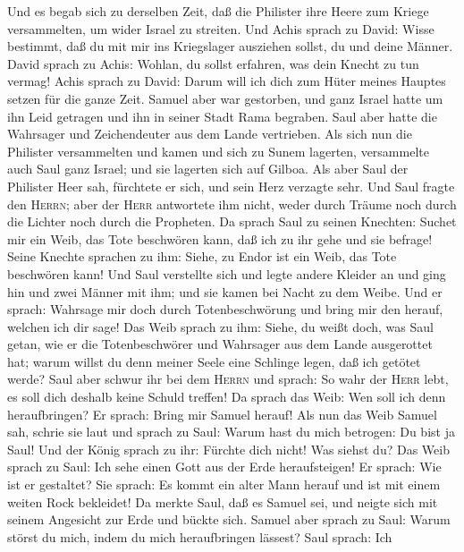  Und es begab sich zu derselben Zeit, daß die Philister
ihre Heere zum Kriege versammelten, um wider Israel zu streiten. Und
Achis sprach zu David: Wisse bestimmt, daß du mit mir ins Kriegslager
ausziehen sollst, du und deine Männer.  David sprach zu
Achis: Wohlan, du sollst erfahren, was dein Knecht zu tun vermag! Achis
sprach zu David: Darum will ich dich zum Hüter meines Hauptes setzen für
die ganze Zeit.  Samuel aber war gestorben, und ganz
Israel hatte um ihn Leid getragen und ihn in seiner Stadt Rama begraben.
Saul aber hatte die Wahrsager und Zeichendeuter aus dem Lande
vertrieben.  Als sich nun die Philister versammelten und
kamen und sich zu Sunem lagerten, versammelte auch Saul ganz Israel; und
sie lagerten sich auf Gilboa.  Als aber Saul der Philister
Heer sah, fürchtete er sich, und sein Herz verzagte sehr. 
Und Saul fragte den \textsc{Herrn}; aber der \textsc{Herr} antwortete
ihm nicht, weder durch Träume noch durch die Lichter noch durch die
Propheten.  Da sprach Saul zu seinen Knechten: Suchet mir
ein Weib, das Tote beschwören kann, daß ich zu ihr gehe und sie befrage!
Seine Knechte sprachen zu ihm: Siehe, zu Endor ist ein Weib, das Tote
beschwören kann!  Und Saul verstellte sich und legte
andere Kleider an und ging hin und zwei Männer mit ihm; und sie kamen
bei Nacht zu dem Weibe. Und er sprach: Wahrsage mir doch durch
Totenbeschwörung und bring mir den herauf, welchen ich dir sage!
 Das Weib sprach zu ihm: Siehe, du weißt doch, was Saul
getan, wie er die Totenbeschwörer und Wahrsager aus dem Lande
ausgerottet hat; warum willst du denn meiner Seele eine Schlinge legen,
daß ich getötet werde?  Saul aber schwur ihr bei dem
\textsc{Herrn} und sprach: So wahr der \textsc{Herr} lebt, es soll dich
deshalb keine Schuld treffen!  Da sprach das Weib: Wen
soll ich denn heraufbringen? Er sprach: Bring mir Samuel herauf!
 Als nun das Weib Samuel sah, schrie sie laut und sprach
zu Saul: Warum hast du mich betrogen: Du bist ja Saul! 
Und der König sprach zu ihr: Fürchte dich nicht! Was siehst du? Das Weib
sprach zu Saul: Ich sehe einen Gott aus der Erde heraufsteigen!
 Er sprach: Wie ist er gestaltet? Sie sprach: Es kommt
ein alter Mann herauf und ist mit einem weiten Rock bekleidet! Da merkte
Saul, daß es Samuel sei, und neigte sich mit seinem Angesicht zur Erde
und bückte sich.  Samuel aber sprach zu Saul: Warum
störst du mich, indem du mich heraufbringen lässest? Saul sprach: Ich
